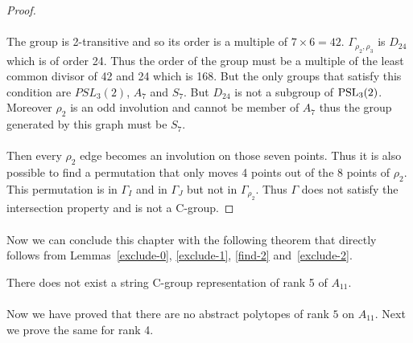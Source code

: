 \begin{proof}
  \paragraph{}
  The group is 2-transitive and so its order is a multiple of $7 \times 6 = 42$. $\Gamma_{\rho_2, \rho_3}$ is $D_{24}$ which is of order 24. Thus the order of the group must be a multiple of the least common divisor of 42 and 24 which is 168. But the only groups that satisfy this condition are $PSL_3(2)$, $A_7$ and $S_7$. But $D_{24}$ is not a subgroup of $\operatorname{PSL}_3(2)$. Moreover $\rho_2$ is an odd involution and cannot be member of $A_7$ thus the group generated by this graph must be $S_7$.

  \paragraph{}
  Then every $\rho_2$ edge becomes an involution on those seven points. Thus it is also possible to find a permutation that only moves 4 points out of the 8 points of $\rho_2$. This permutation is in $\Gamma_{I}$ and in $\Gamma_{J}$ but not in $\Gamma_{\rho_2}$. Thus $\Gamma$ does not satisfy the intersection property and is not a C-group.

\end{proof}

\paragraph{}
Now we can conclude this chapter with the following theorem that directly follows from Lemmas~\ref{exclude-0}, \ref{exclude-1}, \ref{find-2} and~\ref{exclude-2}.

\begin{theorem}
  There does not exist a string C-group representation of rank 5 of $A_{11}$.
\end{theorem}

\paragraph{}
Now we have proved that there are no abstract polytopes of rank $5$ on $A_{11}$. Next we prove the same for rank 4.
